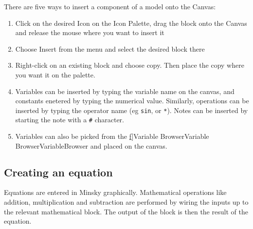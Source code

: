 There are five ways to insert a component of a model onto the Canvas: 
\begin{enumerate}
\item Click on the desired Icon on the Icon Palette, drag the block onto
the Canvas and release the mouse where you want to insert it
\begin{center}
\par\end{center}
\item Choose Insert from the menu and select the desired block there


\begin{center}
 
\par\end{center}

\newpage{}
\item Right-click on an existing block and choose copy. Then place the copy
where you want it on the palette.
\begin{center}
\par\end{center}
\item Variables can be inserted by typing the variable name on the canvas,
and constants enetered by typing the numerical value. Similarly, operations
can be inserted by typing the operator name (eg \verb+sin+, or \verb+*+).
Notes can be inserted by starting the note with a \verb+#+ character.
\item Variables can also be picked from the \hyperref{[}{r}{e}f{]}{Variable
Browser}{Variable Browser}{}{VariableBrowser} and placed on
the canvas. 
\end{enumerate}

\subsection{Creating an equation}

Equations are entered in Minsky graphically. Mathematical operations
like addition, multiplication and subtraction are performed by wiring
the inputs up to the relevant mathematical block. The output of the
block is then the result of the equation.

